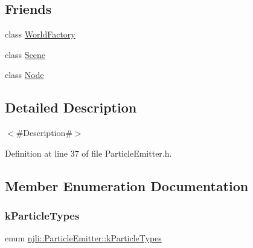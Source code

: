 \subsection*{Friends}
\begin{DoxyCompactItemize}
\item 
class \mbox{\hyperlink{classnjli_1_1_particle_emitter_acb96ebb09abe8f2a37a915a842babfac}{World\+Factory}}
\item 
class \mbox{\hyperlink{classnjli_1_1_particle_emitter_a032858ae1fe02d2d1170981c2af2d67c}{Scene}}
\item 
class \mbox{\hyperlink{classnjli_1_1_particle_emitter_a6db9d28bd448a131448276ee03de1e6d}{Node}}
\end{DoxyCompactItemize}


\subsection{Detailed Description}
$<$\#\+Description\#$>$ 

Definition at line 37 of file Particle\+Emitter.\+h.



\subsection{Member Enumeration Documentation}
\mbox{\label{classnjli_1_1_particle_emitter_a5c7255dcebae161993253a14c1c4e097}} 
\subsubsection{\texorpdfstring{k\+Particle\+Types}{kParticleTypes}}
{\footnotesize\ttfamily enum \mbox{\hyperlink{classnjli_1_1_particle_emitter_a5c7255dcebae161993253a14c1c4e097}{njli\+::\+Particle\+Emitter\+::k\+Particle\+Types}}\hspace{0.3cm}{\ttfamily [private]}}

